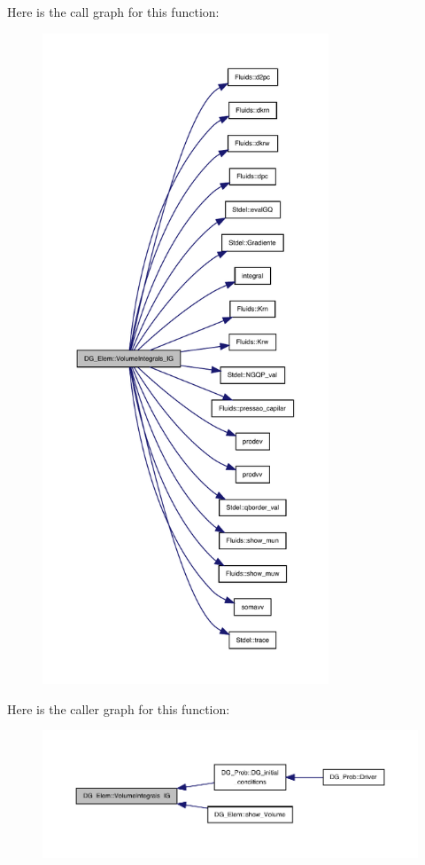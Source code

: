 Here is the call graph for this function\+:
\nopagebreak
\begin{figure}[H]
\begin{center}
\leavevmode
\includegraphics[height=550pt]{classDG__Elem_a3fc71dbfe141c0d42dc8ceff8f0ef8ce_cgraph}
\end{center}
\end{figure}
Here is the caller graph for this function\+:
\nopagebreak
\begin{figure}[H]
\begin{center}
\leavevmode
\includegraphics[width=350pt]{classDG__Elem_a3fc71dbfe141c0d42dc8ceff8f0ef8ce_icgraph}
\end{center}
\end{figure}
\mbox{\label{classDG__Elem_ab3de164caf40da7cc0b123928ad83cc9}} 
